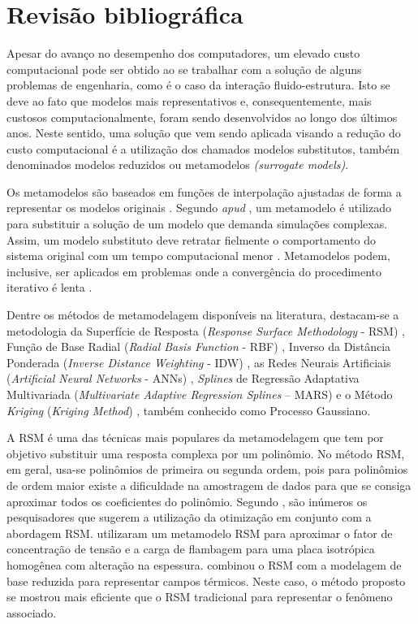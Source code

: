 \chapter{Revisão bibliográfica} \label{chap_revisao}


Apesar do avanço no desempenho dos computadores, um elevado custo computacional pode ser obtido ao se trabalhar com a solução de alguns problemas de engenharia, como é o caso da interação fluido-estrutura. Isto se deve ao fato que modelos mais representativos e, consequentemente, mais custosos computacionalmente, foram sendo desenvolvidos ao longo dos últimos anos. Neste sentido, uma solução que vem sendo aplicada visando a redução do custo computacional é a utilização dos chamados modelos substitutos, também denominados modelos reduzidos ou metamodelos {\it (surrogate models)}. 

Os metamodelos são baseados em funções de interpolação ajustadas de forma a representar os modelos originais \cite{VANBEERSKLEIJNEN2004}. Segundo  {\it apud} , um metamodelo é utilizado para substituir a solução de um modelo que demanda simulações complexas. Assim, um modelo substituto deve retratar fielmente o comportamento do sistema original com um tempo computacional menor \cite{Luo2014}. Metamodelos podem, inclusive, ser aplicados em problemas onde a convergência do procedimento iterativo é lenta \cite{VILLAR2016}.

Dentre os métodos de metamodelagem disponíveis na literatura, destacam-se a metodologia da Superfície de Resposta (\textit{Response Surface Methodology} - RSM)  \cite{PINA2010}, Função de Base Radial (\textit{Radial Basis Function} - RBF) \cite{Rueda2019,YIN2018}, Inverso da Distância Ponderada (\textit{Inverse Distance Weighting} - IDW) \cite{HWANG2018}, as Redes Neurais Artificiais (\textit{Artificial Neural Networks} - ANNs) \cite{NAZERIAN2018,SANTOS2013}, {\it Splines} de Regressão Adaptativa Multivariada (\textit{Multivariate Adaptive Regression Splines} – MARS) \cite {LIRAJr2012,friedman1991} e o Método {\it Kriging} (\textit{Kriging Method}) \cite{Erickson2018,KLEIJNEN2015}, também conhecido como Processo Gaussiano. 

A RSM é uma das técnicas mais populares da metamodelagem que tem por objetivo substituir uma resposta complexa por um polinômio. No método RSM, em geral, usa-se polinômios de primeira ou segunda ordem, pois para polinômios de ordem maior existe a dificuldade na amostragem de dados para que se consiga aproximar todos os coeficientes do polinômio. Segundo , são inúmeros os pesquisadores que sugerem a utilização da otimização em conjunto com a abordagem RSM.  utilizaram um metamodelo RSM para aproximar o fator de concentração de tensão e a carga de flambagem para uma placa isotrópica homogênea com alteração na espessura.  combinou o RSM com a modelagem de base reduzida para representar campos térmicos. Neste caso, o método proposto se mostrou mais eficiente que o RSM tradicional para representar o fenômeno associado. 

